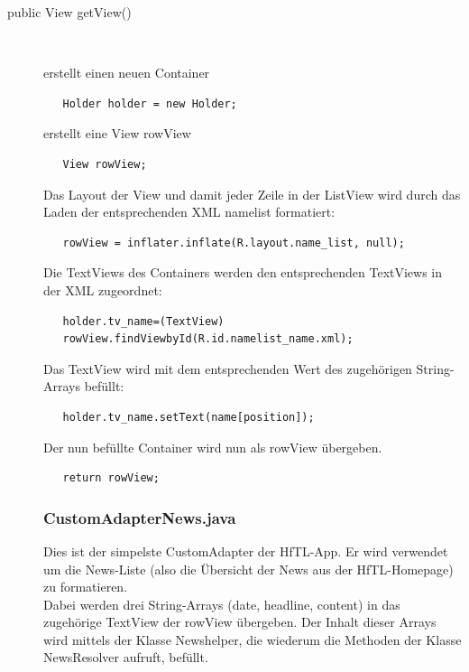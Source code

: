 \begin{description}
\item [public View getView()]~\par
erstellt einen neuen Container 
\begin{lstlisting}
   Holder holder = new Holder;
\end{lstlisting}
erstellt eine View rowView
\begin{lstlisting}
   View rowView;
\end{lstlisting}
Das Layout der View und damit jeder Zeile in der ListView wird durch das Laden der entsprechenden XML namelist formatiert:
\begin{lstlisting}
   rowView = inflater.inflate(R.layout.name_list, null);
\end{lstlisting}
Die TextViews des Containers werden den entsprechenden TextViews in der XML zugeordnet:
\begin{lstlisting}
   holder.tv_name=(TextView)
   rowView.findViewbyId(R.id.namelist_name.xml);
\end{lstlisting}
Das TextView wird mit dem entsprechenden Wert des zugehörigen String-Arrays befüllt:
\begin{lstlisting}
   holder.tv_name.setText(name[position]);
\end{lstlisting}
Der nun befüllte Container wird nun als rowView übergeben.
\begin{lstlisting}
   return rowView;
\end{lstlisting}
\subsubsection{CustomAdapterNews.java} 
Dies ist der simpelste CustomAdapter der HfTL-App. Er wird verwendet um die News-Liste (also die Übersicht der News aus der HfTL-Homepage) zu formatieren.\\
Dabei werden drei String-Arrays (date, headline, content) in das zugehörige TextView der rowView übergeben. Der Inhalt dieser Arrays wird mittels der Klasse Newshelper, die wiederum die Methoden der Klasse NewsResolver aufruft, befüllt.

\end{description}
